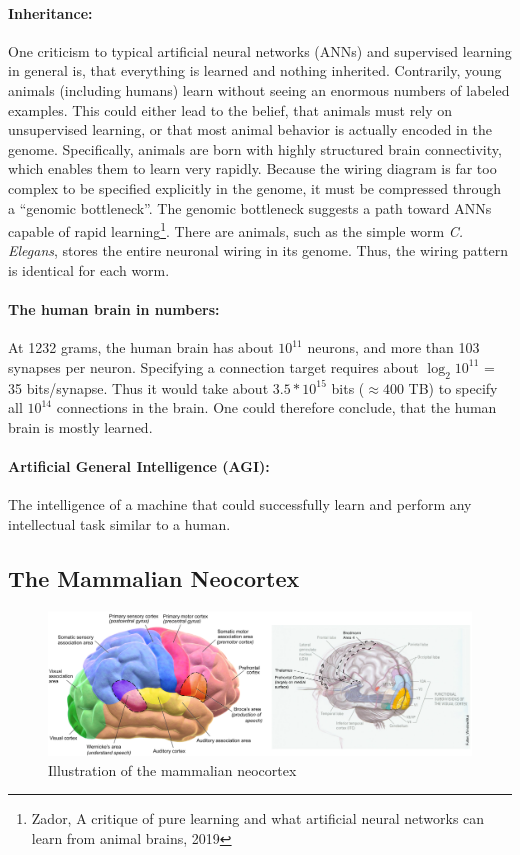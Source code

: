 \documentclass[main]{subfiles}
\begin{document}
\paragraph{Inheritance:} One criticism to typical artificial neural networks (ANNs) and supervised learning in general is, that everything is learned and nothing inherited. Contrarily, young animals (including humans) learn without seeing an enormous numbers of labeled examples. This could either lead to the belief, that animals must rely on unsupervised learning, or that most animal behavior is actually encoded in the genome. Specifically, animals are born with highly structured brain connectivity, which enables them to learn very rapidly. Because the wiring diagram is far too complex to be specified explicitly in the genome, it must be compressed through a “genomic bottleneck”. The genomic bottleneck suggests a path toward ANNs capable of rapid learning\footnote{Zador, A critique of pure learning and what artificial neural networks can learn from animal brains, 2019}. There are animals, such as the simple worm \textit{C. Elegans}, stores the entire neuronal wiring in its genome. Thus, the wiring pattern is identical for each worm. 

\paragraph{The human brain in numbers:} At 1232 grams, the human brain has about $10^{11}$ neurons, and more than 103 synapses per neuron. Specifying a connection target requires about $\log_2 10^{11}$ = 35 bits/synapse. Thus it would take about $3.5 * 10^{15}$ bits ($\approx 400$ TB) to specify all $10^{14}$ connections in the brain. One could therefore conclude, that the human brain is mostly learned.

\paragraph{Artificial General Intelligence (AGI):} The intelligence of a machine that could successfully learn and perform any intellectual task similar to a human.

\newpage
\subsection{The Mammalian Neocortex}
\begin{figure}[h]
    \centering
    \includegraphics[width=0.99\linewidth]{01_Introduction/figures/neocortex.png}
    \caption{Illustration of the mammalian neocortex}
    \label{fig:basalandcerebellum}
\end{figure}
\end{document}
